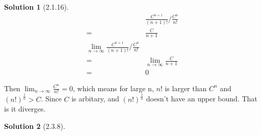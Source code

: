 \documentclass{article}
\theoremstyle{definition}
\newtheorem{sol}{Solution}[exe]
\begin{document}
\begin{sol}[2.1.16]

    \begin{align*}
        & \frac{C^{n+1}}{(n+1)!}/\frac{C^{n}}{n!}\\
        =& \frac{C}{n+1}\\
        \lim_{n\to\infty}\frac{C^{n+1}}{(n+1)!}/\frac{C^{n}}{n!}\\
        =& \lim_{n\to\infty}\frac{C}{n+1}\\
        =& 0
    \end{align*}

    Then $\lim_{n\to\infty}\frac{C^{n}}{n!}=0$, which means for large n, $n!$ is larger than $C^{n}$ and $(n!)^{\frac{1}{n}}>C$. Since $C$ is arbitary, and $(n!)^{\frac{1}{n}}$ 
    doesn't have an upper bound. That is it diverges.
\end{sol}


\begin{sol}[2.3.8]

    
\end{sol}
\end{document}
